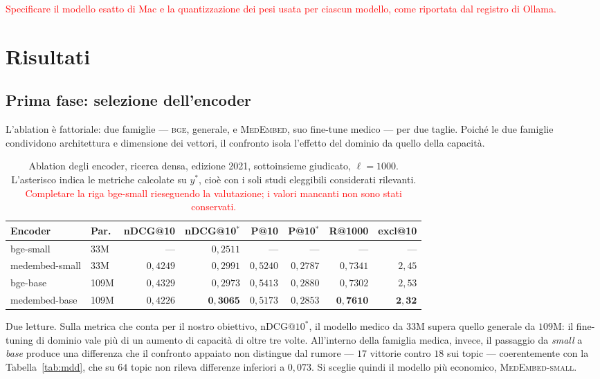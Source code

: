 \documentclass[pdflatex,sn-mathphys-num]{sn-jnl}
\theoremstyle{thmstyleone}
\theoremstyle{thmstyletwo}
\theoremstyle{thmstylethree}
\newcommand{\ev}[1]{\textcolor{red}{#1}}
\begin{document}
\ev{Specificare il modello esatto di Mac e la quantizzazione dei pesi usata per ciascun modello, come riportata dal registro di Ollama.}

\section{Risultati}\label{sec:risultati}

\subsection{Prima fase: selezione dell'encoder}\label{sec:res-encoder}

L'ablation è fattoriale: due famiglie --- \textsc{bge}, generale, e \textsc{MedEmbed}, suo fine-tune medico --- per due taglie. Poiché le due famiglie condividono architettura e dimensione dei vettori, il confronto isola l'effetto del dominio da quello della capacità.

\begin{table}[H]
\centering
\begin{tabular}{llrrrrrr}
\toprule
Encoder & Par. & nDCG@10 & nDCG@10$^{*}$ & P@10 & P@10$^{*}$ & R@1000 & excl@10 \\
\midrule
bge-small      & 33M  & --- & $0{,}2511$ & --- & --- & --- & --- \\
medembed-small & 33M  & $0{,}4249$ & $0{,}2991$ & $0{,}5240$ & $0{,}2787$ & $0{,}7341$ & $2{,}45$ \\
bge-base       & 109M & $0{,}4329$ & $0{,}2973$ & $0{,}5413$ & $0{,}2880$ & $0{,}7302$ & $2{,}53$ \\
medembed-base  & 109M & $0{,}4226$ & $\mathbf{0{,}3065}$ & $0{,}5173$ & $0{,}2853$ & $\mathbf{0{,}7610}$ & $\mathbf{2{,}32}$ \\
\bottomrule
\end{tabular}
\caption{Ablation degli encoder, ricerca densa, edizione 2021, sottoinsieme giudicato, $\ell = 1000$. L'asterisco indica le metriche calcolate su $y^{*}$, cioè con i soli studi eleggibili considerati rilevanti. \ev{Completare la riga bge-small rieseguendo la valutazione; i valori mancanti non sono stati conservati.}}
\label{tab:encoder}
\end{table}

Due letture. Sulla metrica che conta per il nostro obiettivo, $\mathrm{nDCG@}10^{*}$, il modello medico da $33$M supera quello generale da $109$M: il fine-tuning di dominio vale più di un aumento di capacità di oltre tre volte. All'interno della famiglia medica, invece, il passaggio da \emph{small} a \emph{base} produce una differenza che il confronto appaiato non distingue dal rumore --- $17$ vittorie contro $18$ sui topic --- coerentemente con la Tabella~\ref{tab:mdd}, che su $64$ topic non rileva differenze inferiori a $0{,}073$. Si sceglie quindi il modello più economico, \textsc{MedEmbed-small}.
\end{document}
